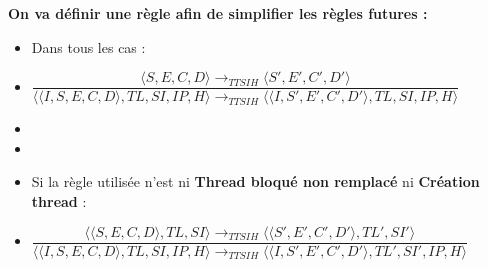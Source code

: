 \documentclass[10pt,a4paper]{report}
\begin{document}
	
	\textbf{On va définir une règle afin de simplifier les règles futures :} 
	\begin{itemize}
		\item[] Dans tous les cas :
		\item[] \begin{center}
			$\dfrac{\langle S,E,C,D\rangle \longrightarrow_{TTSIH} \langle S',E',C',D'\rangle}{\langle\langle I,S,E,C,D\rangle,TL,SI,IP,H\rangle \longrightarrow_{TTSIH} \langle\langle I,S',E',C',D'\rangle,TL,SI,IP,H\rangle}$
		\end{center}
		\item[]
		\item[]
		\item[] Si la règle utilisée n'est ni \textbf{Thread bloqué non remplacé} ni \textbf{Création thread} :
		\smallbreak 
		\item[] \begin{center}
			$\dfrac{\langle\langle S,E,C,D\rangle,TL,SI\rangle \longrightarrow_{TTSIH} \langle\langle S',E',C',D'\rangle,TL',SI'\rangle}{\langle\langle I,S,E,C,D\rangle,TL,SI,IP,H\rangle \longrightarrow_{TTSIH} \langle\langle I,S',E',C',D'\rangle,TL',SI',IP,H\rangle}$ 
		\end{center}
	\end{itemize}
	\newpage
	
\end{document}
